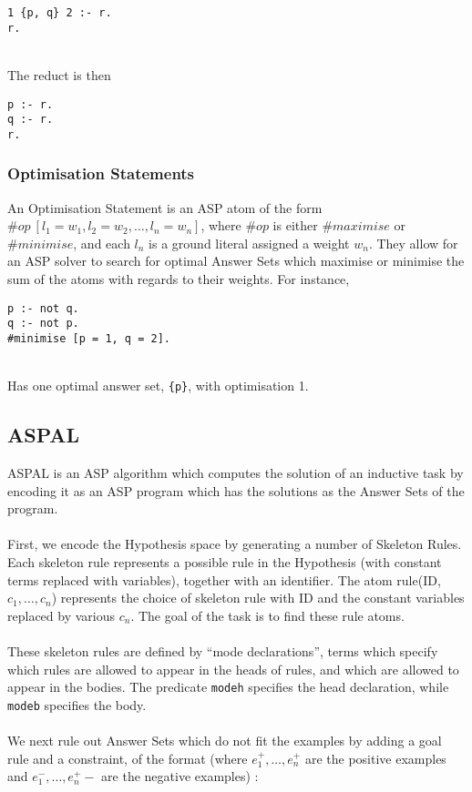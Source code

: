 \begin{lstlisting}
1 {p, q} 2 :- r.
r.
\end{lstlisting}
\mbox{}\\
The reduct is then \\

\begin{lstlisting}
p :- r.
q :- r.
r.
\end{lstlisting}

\subsubsection{Optimisation Statements}

An Optimisation Statement is an ASP atom of the form $ \#op \: [l_1 = w_1, l_2 = w_2, \dots, l_n = w_n]$, where $\#op$ is either $\#maximise$ or $\#minimise$, and each $l_n$ is a ground literal assigned a weight $w_n$. They allow for an ASP solver to search for optimal Answer Sets which maximise or minimise the sum of the atoms with regards to their weights. For instance, \\

\begin{lstlisting}
p :- not q.
q :- not p.
#minimise [p = 1, q = 2].
\end{lstlisting}
\mbox{}\\
Has one optimal answer set, \lstinline!{p}!, with optimisation 1.

\subsection{ASPAL}

ASPAL is an ASP algorithm which computes the solution of an inductive task by encoding it as an ASP program which has the solutions as the Answer Sets of the program.\\ \\
First, we encode the Hypothesis space by generating a number of Skeleton Rules. Each skeleton rule represents a possible rule in the Hypothesis (with constant terms replaced with variables), together with an identifier. The atom rule(ID, $c_1, \dots, c_n$) represents the choice of skeleton rule with ID and the constant variables replaced by various $c_n$. The goal of the task is to find these rule atoms.\\ \\
These skeleton rules are defined by ``mode declarations'', terms which specify which rules are allowed to appear in the heads of rules, and which are allowed to appear in the bodies. The predicate \lstinline!modeh! specifies the head declaration, while \lstinline!modeb! specifies the body. \\ \\
We next rule out Answer Sets which do not fit the examples by adding a goal rule and a constraint, of the format (where $e_1^+, \dots, e_n^+$ are the positive examples and $e_1^-, \dots, e_n^+-$ are the negative examples) : \\

